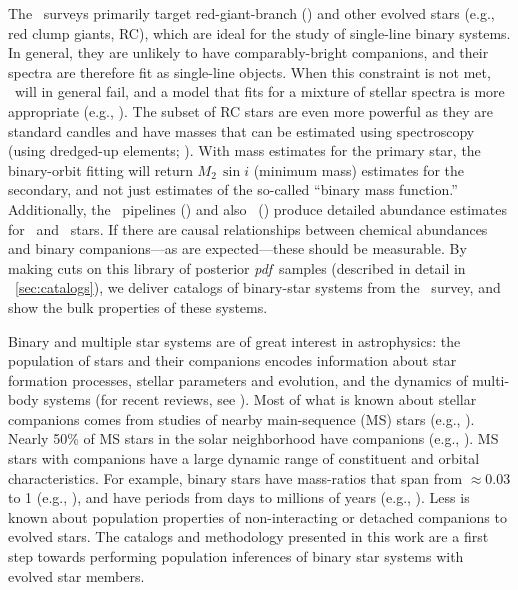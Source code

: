 \documentclass[modern, letterpaper]{aastex62}
\newcommand{\apogee}{\project{\acronym{APOGEE}}}
\newcommand{\thejoker}{\project{The~Joker}}
\newcommand{\thecannon}{\project{The~Cannon}}
\newcommand{\RC}{\acronym{RC}}
\newcommand{\RGB}{\acronym{RGB}}
\newcommand{\pdf}{\textit{pdf}}
\begin{document}
The \apogee\ surveys primarily target red-giant-branch (\RGB) and other evolved
stars (e.g., red clump giants, RC), which are ideal for the study of single-line
binary systems.
In general, they are unlikely to have comparably-bright companions, and their
spectra are therefore fit as single-line objects.
When this constraint is not met, \thejoker\ will in general fail, and a model
that fits for a mixture of stellar spectra is more appropriate (e.g.,
\citealt{El-Badry:2018}).
The subset of RC stars are even more powerful as they are standard candles and
have masses that can be estimated using spectroscopy (using dredged-up elements;
\citealt{Martig:2016,Ness:2016}).
With mass estimates for the primary star, the binary-orbit fitting will return
$M_2\,\sin i$ (minimum mass) estimates for the secondary, and not just estimates
of the so-called ``binary mass function.''
Additionally, the \apogee\ pipelines (\citealt{Garcia-Perez:2016}) and also
\thecannon\ (\citealt{Ness:2015}) produce detailed abundance estimates for \RGB\
and \RC\ stars.
If there are causal relationships between chemical abundances and binary
companions---as are expected---these should be measurable.
By making cuts on this library of posterior \pdf\ samples (described in detail
in \sectionname~\ref{sec:catalogs}), we deliver catalogs of binary-star systems
from the \apogee\ survey, and show the bulk properties of these systems.

Binary and multiple star systems are of great interest in astrophysics: the
population of stars and their companions encodes information about star
formation processes, stellar parameters and evolution, and the dynamics of
multi-body systems (for recent reviews, see \citealt{Duchene:2013,Moe:2017}).
Most of what is known about stellar companions comes from studies of nearby
main-sequence (MS) stars (e.g.,
\citealt{Duquennoy:1991,Raghavan:2010,Tokovinin:2014,Moe:2017}).
Nearly 50\% of MS stars in the solar neighborhood have companions
(e.g., \citealt{Tokovinin:2014}).
MS stars with companions have a large dynamic range of constituent and orbital
characteristics.
For example, binary stars have mass-ratios that span from $\approx 0.03$
to 1 (e.g., \citealt{Kraus:2008}), and have periods from days to
millions of years (e.g., \citealt{Raghavan:2010}).
Less is known about population properties of non-interacting or detached
companions to evolved stars.
The catalogs and methodology presented in this work are a first step towards
performing population inferences of binary star systems with evolved star
members.
\end{document}
